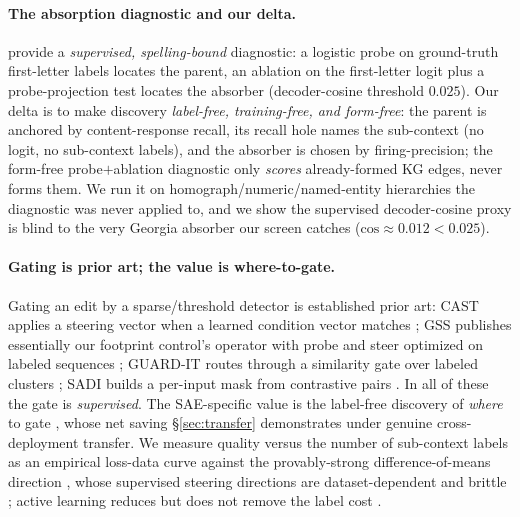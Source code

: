 \documentclass[11pt,letterpaper]{article}
\begin{document}
\paragraph{The absorption diagnostic and our delta.} \citet{Chanin2024} provide a \emph{supervised, spelling-bound} diagnostic: a logistic probe on ground-truth first-letter labels locates the parent, an ablation on the first-letter logit plus a probe-projection test locates the absorber (decoder-cosine threshold $0.025$). Our delta is to make discovery \emph{label-free, training-free, and form-free}: the parent is anchored by content-response recall, its recall hole names the sub-context (no logit, no sub-context labels), and the absorber is chosen by firing-precision; the form-free probe$+$ablation diagnostic only \emph{scores} already-formed KG edges, never forms them. We run it on homograph/numeric/named-entity hierarchies the diagnostic was never applied to, and we show the supervised decoder-cosine proxy is blind to the very Georgia absorber our screen catches ($\textrm{cos}\approx 0.012<0.025$).

\paragraph{Gating is prior art; the value is where-to-gate.} Gating an edit by a sparse/threshold detector is established prior art: CAST applies a steering vector when a learned condition vector matches \citep{Lee2024}; GSS publishes essentially our footprint control's operator with probe and steer optimized on labeled sequences \citep{Zhang2026}; GUARD-IT routes through a similarity gate over labeled clusters \citep{Turani2026}; SADI builds a per-input mask from contrastive pairs \citep{Wang2024}. In all of these the gate is \emph{supervised}. The SAE-specific value is the label-free discovery of \emph{where} to gate \citep{Peng2025}, whose net saving \S\ref{sec:transfer} demonstrates under genuine cross-deployment transfer. We measure quality versus the number of sub-context labels as an empirical loss-data curve \citep{Whitney2020} against the provably-strong difference-of-means direction \citep{Im2025}, whose supervised steering directions are dataset-dependent and brittle \citep{Tan2024}; active learning reduces but does not remove the label cost \citep{Rauch2025, Cho2022, Chatzoudis2025}.
\end{document}
